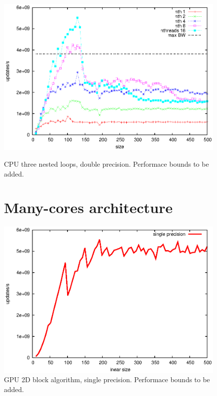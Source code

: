 \documentclass[a4paper,12pt]{article}
\begin{document}
\begin{figure}[t]
\begin{minipage}[t]{1.0\linewidth}
\includegraphics[scale=1.0]{./jacobi_idp_baseline.eps}
\caption{\label{fig:cpu} \small CPU three nested loops, double
  precision. Performace bounds to be added.}
\end{minipage}

\section{Many-cores architecture}

\begin{minipage}[t]{1.0\linewidth}
\includegraphics[scale=1.0]{./jacobi_gpu.eps}
\caption{\label{fig:gpu} \small GPU 2D block algorithm, single
  precision. Performace bounds to be added.}
\end{minipage}
\end{figure}
       
\end{document}
